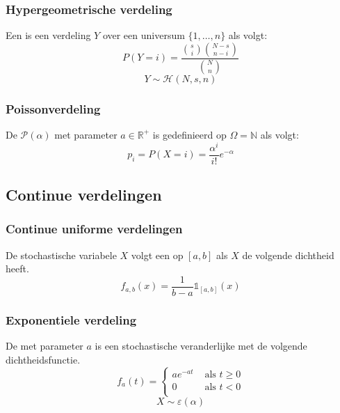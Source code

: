 \documentclass[main.tex]{subfiles}
\begin{document}
\subsubsection{Hypergeometrische verdeling}
\label{sec:hyperg-verd}

\begin{de}
  Een  is een verdeling $Y$ over een universum $\{1,\dotsc,n\}$ als volgt:
  \[ P(Y = i) = \frac{\binom{s}{i}\binom{N-s}{n-i}}{\binom{N}{n}}\]
  \[ Y \sim \mathcal{H}(N,s,n) \]
\end{de}

\subsubsection{Poissonverdeling}
\label{sec:poissonverdeling}

\begin{de}
  De  $\mathcal{P}(\alpha)$ met parameter $a\in \mathbb{R}^{+}$ is gedefinieerd op $\Omega = \mathbb{N}$ als volgt:
  \[ p_{i} = P(X=i) = \frac{\alpha^{i}}{i!}e^{-\alpha} \]
\end{de}

\subsection{Continue verdelingen}
\label{sec:continue-verdelingen}

\subsubsection{Continue uniforme verdelingen}
\label{sec:cont-unif-verd}

\begin{de}
  De stochastische variabele $X$ volgt een  op $[a,b]$ als $X$ de volgende dichtheid heeft.
  \[ f_{a,b}(x) = \frac{1}{b-a}\mathbb{1}_{[a,b]}(x) \]
\end{de}

\subsubsection{Exponentiele verdeling}
\label{sec:expon-verd}

\begin{de}
  De  met parameter $a$ is een stochastische veranderlijke met de volgende dichtheidsfunctie.
  \[
  f_{a}(t) =
  \left\{
    \begin{array}{cl}
      ae^{-at} &\text{ als } t \ge 0\\
      0      &\text{ als } t < 0\\
    \end{array}
  \right.
  \]
  \[ X \sim \varepsilon(\alpha) \]
\end{de}
\end{document}
